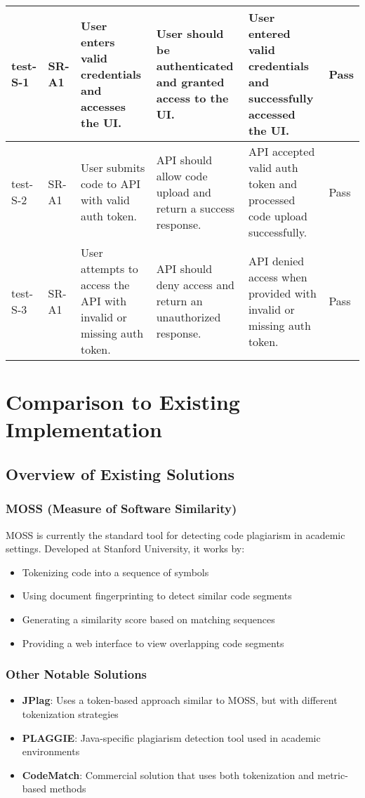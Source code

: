 \documentclass[12pt, titlepage]{article}
\begin{document}
\begin{longtable}[c]{|p{1.5cm}|p{1.5cm}|p{2.5cm}|p{2.5cm}|p{2.5cm}|p{1.5cm}|}
    \hline
    test-S-1 & SR-A1 & User enters valid credentials and accesses the UI. & User 
    should be authenticated and granted access to the UI. & User entered valid 
    credentials and successfully accessed the UI. & Pass \\
    \hline
    test-S-2 & SR-A1 & User submits code to API with valid auth token. & API 
    should allow code upload and return a success response. & API accepted 
    valid auth token and processed code upload successfully. & Pass \\
    \hline
    test-S-3 & SR-A1 & User attempts to access the API with invalid or missing 
    auth token. & API should deny access and return an unauthorized response. 
    & API denied access when provided with invalid or missing auth token. & Pass \\
    \hline
    \end{longtable}
	
\section{Comparison to Existing Implementation}	

\subsection{Overview of Existing Solutions}

\subsubsection{MOSS (Measure of Software Similarity)}
MOSS is currently the standard tool for detecting code plagiarism in academic settings. Developed at Stanford University, it works by:
\begin{itemize}
    \item Tokenizing code into a sequence of symbols
    \item Using document fingerprinting to detect similar code segments
    \item Generating a similarity score based on matching sequences
    \item Providing a web interface to view overlapping code segments
\end{itemize}

\subsubsection{Other Notable Solutions}
\begin{itemize}
    \item \textbf{JPlag}: Uses a token-based approach similar to MOSS, but with different tokenization strategies
    \item \textbf{PLAGGIE}: Java-specific plagiarism detection tool used in academic environments
    \item \textbf{CodeMatch}: Commercial solution that uses both tokenization and metric-based methods
\end{itemize}
\end{document}
